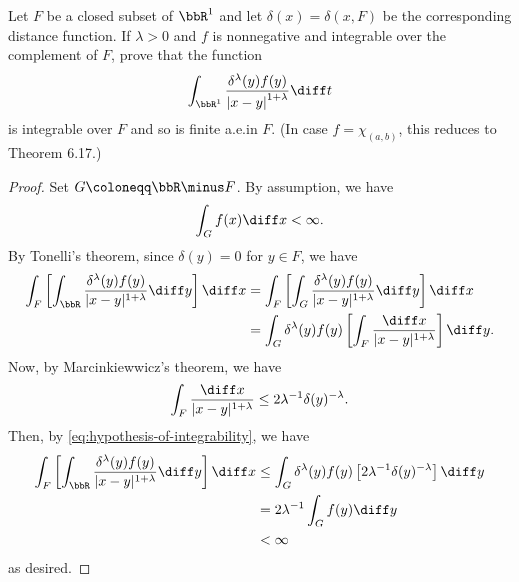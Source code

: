 \begin{problem}
Let $F$ be a closed subset of $\bbR^1$ and let $\delta(x)=\delta(x,F)$ be
the corresponding distance function. If $\lambda>0$ and $f$ is nonnegative
and integrable over the complement of $F$, prove that the function
\[
\int_{\bbR^1}\frac{\delta^\lambda(y)f(y)}{\left|x-y\right|^{1+\lambda}}\diff
t
\]
is integrable over $F$ and so is finite a.e.\@ in $F$. (In case
$f=\chi_{(a,b)}$, this reduces to Theorem 6.17.)
\end{problem}
\begin{proof}
Set $G\coloneqq\bbR\minus F$. By assumption, we have
\begin{equation}
  \label{eq:hypothesis-of-integrability}
\int_Gf(x)\diff x<\infty.
\end{equation}
By Tonelli's theorem, since $\delta(y)=0$ for $y\in F$, we have
\begin{equation}
\label{eq:application-of-tonelli}
\begin{aligned}[t]
\int_F\left[\int_\bbR\frac{\delta^\lambda(y)f(y)}{|x-y|^{1+\lambda}}\diff
  y\right]\diff x
&=\int_F\left[\int_G\frac{\delta^\lambda(y)f(y)}{|x-y|^{1+\lambda}}\diff
  y\right]\diff x\\
&=\int_G\delta^\lambda(y)f(y)\left[\int_F\frac{\diff
    x}{|x-y|^{1+\lambda}}\right]\diff y.
\end{aligned}
\end{equation}
Now, by Marcinkiewwicz's theorem, we have
\begin{equation}
  \label{eq:application-of-marcinkiewicz}
\int_F\frac{\diff x}{|x-y|^{1+\lambda}}\leq
2\lambda^{-1}\delta(y)^{-\lambda}.
\end{equation}
Then, by \eqref{eq:hypothesis-of-integrability}, we have
\begin{equation}
\label{eq:application-of-fubini-2}
\begin{aligned}[t]
 \int_F\left[\int_\bbR\frac{\delta^{\lambda}(y)f(y)}{|x-y|^{1+\lambda}}\diff
y\right]\diff x
&\leq\int_G\delta^\lambda(y)f(y)\left[2\lambda^{-1}\delta(y)^{-\lambda}\right]\diff
y\\
&=2\lambda^{-1}\int_Gf(y)\diff y\\
&<\infty
\end{aligned}
\end{equation}
as desired.
\end{proof}
\newpage

